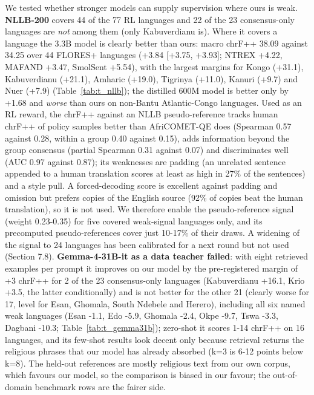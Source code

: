 We tested whether stronger models can supply supervision where ours is weak. \textbf{NLLB-200} covers 44 of the 77 RL languages and 22 of the 23 consensus-only languages are \emph{not} among them (only Kabuverdianu is). Where it covers a language the 3.3B model is clearly better than ours: macro chrF++ 38.09 against 34.25 over 44 FLORES+ languages (+3.84 {[}+3.75, +3.93{]}; NTREX +4.22, MAFAND +3.47, SmolSent +5.54), with the largest margins for Kongo (+31.1), Kabuverdianu (+21.1), Amharic (+19.0), Tigrinya (+11.0), Kanuri (+9.7) and Nuer (+7.9) (Table~\ref{tab:t_nllb}); the distilled 600M model is better only by +1.68 and \emph{worse} than ours on non-Bantu Atlantic-Congo languages. Used as an RL reward, the chrF++ against an NLLB pseudo-reference tracks human chrF++ of policy samples better than AfriCOMET-QE does (Spearman 0.57 against 0.28, within a group 0.40 against 0.15), adds information beyond the group consensus (partial Spearman 0.31 against 0.07) and discriminates well (AUC 0.97 against 0.87); its weaknesses are padding (an unrelated sentence appended to a human translation scores at least as high in 27\% of the sentences) and a style pull. A forced-decoding score is excellent against padding and omission but prefers copies of the English source (92\% of copies beat the human translation), so it is not used. We therefore enable the pseudo-reference signal (weight 0.23-0.35) for five covered weak-signal languages only, and its precomputed pseudo-references cover just 10-17\% of their draws. A widening of the signal to 24 languages has been calibrated for a next round but not used (Section 7.8). \textbf{Gemma-4-31B-it as a data teacher failed}: with eight retrieved examples per prompt it improves on our model by the pre-registered margin of +3 chrF++ for 2 of the 23 consensus-only languages (Kabuverdianu +16.1, Krio +3.5, the latter conditionally) and is not better for the other 21 (clearly worse for 17, level for Esan, Ghomala, South Ndebele and Herero), including all six named weak languages (Esan -1.1, Edo -5.9, Ghomala -2.4, Okpe -9.7, Tswa -3.3, Dagbani -10.3; Table~\ref{tab:t_gemma31b}); zero-shot it scores 1-14 chrF++ on 16 languages, and its few-shot results look decent only because retrieval returns the religious phrases that our model has already absorbed (k=3 is 6-12 points below k=8). The held-out references are mostly religious text from our own corpus, which favours our model, so the comparison is biased in our favour; the out-of-domain benchmark rows are the fairer side.

